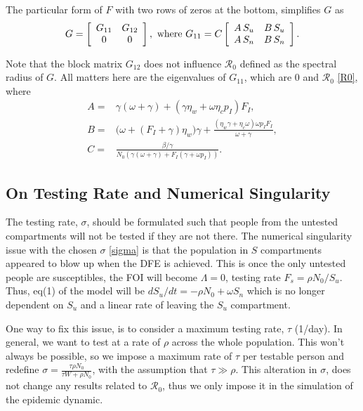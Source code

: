 \documentclass[12pt]{article}
\newcommand{\Rnum}{\mathcal{R}_0}
\theoremstyle{definition} %
\begin{document}
The particular form of $F$ with two rows of zeros at the bottom, simplifies $G$ as 
\begin{equation}
G = \left[ \begin {array}{cc}
G_{11}&G_{12}\\
0&0
\end {array} \right], \text{ where } \\
G_{11} =C
\left[\begin {array}{cc}
A\,S_u & B\,S_u\\
A\,S_n & B\,S_n
\end {array}\right].
\end{equation}

Note that the block matrix $G_{12}$ does not influence $\Rnum$ defined as the spectral radius of $G$. All matters here are the eigenvalues of $G_{11}$, which are 0 and $\Rnum$ \eqref{R0}, 
where
\begin{align*}
A=& \gamma(\omega+\gamma) + (\gamma \eta_w + \omega \eta_c p_I) F_I, \\
B=& \big(\omega+(F_I+\gamma)\eta_w\big) \gamma+\frac{(\eta_w \gamma+ \eta_c\omega) \omega p_I F_I }{\omega+\gamma}, \\ 
C=& \frac{\beta/\gamma}{N_0 (\gamma(\omega+\gamma)+F_I(\gamma+\omega p_I))}.
\end{align*}


\subsection{On Testing Rate and Numerical Singularity}
The testing rate, $\sigma$, should be formulated such that people from the untested compartments will not be tested if they are not there. The numerical singularity issue with the chosen $\sigma$ \eqref{sigma} is that the population in $S$ compartments appeared to blow up when the DFE is achieved. This is once the only untested people are susceptibles, the FOI will become $\Lambda=0$, testing rate $F_s=\rho N_0/S_u$. Thus, eq(1) of the model will be $d S_u/dt = - \rho N_0 + \omega S_n$ which is no longer dependent on $S_u$ and a linear rate of leaving the $S_u$ compartment.

One way to fix this issue, is to consider a maximum testing rate, $\tau$ (1/day). In general, we want to test at a rate of $\rho$ across the whole population. This won't always be possible, so we impose a maximum rate of $\tau$ per testable person and redefine $\sigma = \frac{\tau \rho N_0}{\tau W + \rho N_0}$, with the assumption that $\tau \gg \rho$. This alteration in $\sigma$, does not change any results related to $\Rnum$, thus we only impose it in the simulation of the epidemic dynamic.
\end{document}
